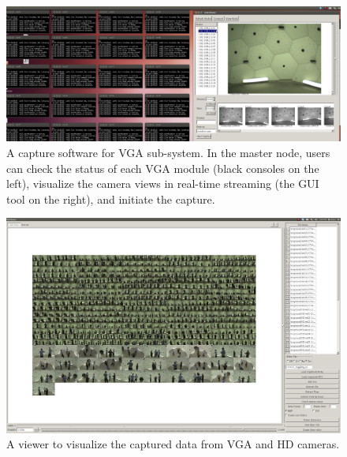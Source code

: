 \begin{figure}
	\includegraphics[width=\linewidth]{fig_system/dome_sw_capture.png}
	\caption{A capture software for VGA sub-system. In the master node, users can check the status of each VGA module (black consoles on the left), visualize the camera views in real-time streaming (the GUI tool on the right), and initiate the capture.}
	\label{fig:dome_vgaSW}
\end{figure}\vspace{0.5cm}
	
\begin{figure}[t]
	\includegraphics[width=\textwidth]{fig_system/dome_sw_viewer.png}
	\caption{A viewer to visualize the captured data from VGA and HD cameras.}
	\label{fig:dome_viewer}
\end{figure}

